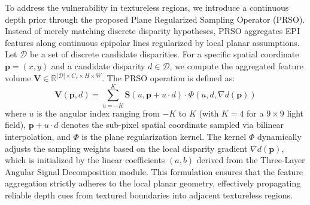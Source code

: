 \documentclass[lettersize,journal]{IEEEtran}
\begin{document}
To address the vulnerability in textureless regions, we introduce a continuous depth prior through the proposed Plane Regularized Sampling Operator (PRSO). Instead of merely matching discrete disparity hypotheses, PRSO aggregates EPI features along continuous epipolar lines regularized by local planar assumptions. Let $\mathcal{D}$ be a set of discrete candidate disparities. For a specific spatial coordinate $\mathbf{p} = (x,y)$ and a candidate disparity $d \in \mathcal{D}$, we compute the aggregated feature volume $\mathbf{V} \in \mathbb{R}^{|\mathcal{D}| \times C_s \times H \times W}$. The PRSO operation is defined as:
\begin{equation}
\label{eq:eq9}
\mathbf{V}(\mathbf{p}, d) = \sum_{u=-K}^{K} \mathbf{S}(u, \mathbf{p} + u \cdot d) \cdot \Phi(u, d, \nabla d(\mathbf{p}))
\end{equation}
where $u$ is the angular index ranging from $-K$ to $K$ (with $K=4$ for a $9 \times 9$ light field), $\mathbf{p} + u \cdot d$ denotes the sub-pixel spatial coordinate sampled via bilinear interpolation, and $\Phi$ is the plane regularization kernel. The kernel $\Phi$ dynamically adjusts the sampling weights based on the local disparity gradient $\nabla d(\mathbf{p})$, which is initialized by the linear coefficients $(a, b)$ derived from the Three-Layer Angular Signal Decomposition module. This formulation ensures that the feature aggregation strictly adheres to the local planar geometry, effectively propagating reliable depth cues from textured boundaries into adjacent textureless regions.
\end{document}

